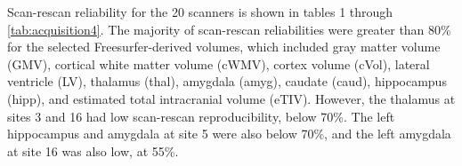 Scan-rescan reliability for the 20 scanners is shown in tables 1 through \ref{tab:acquisition4}. The majority of scan-rescan reliabilities were greater than 80\% for the selected Freesurfer-derived volumes, which included gray matter volume (GMV), cortical white matter volume (cWMV), cortex volume (cVol), lateral ventricle (LV), thalamus (thal), amygdala (amyg), caudate (caud), hippocampus (hipp), and estimated total intracranial volume (eTIV). However, the thalamus at sites 3 and 16 had low scan-rescan reproducibility, below 70\%. The left hippocampus and amygdala at site 5 were also below 70\%, and the left amygdala at site 16 was also low, at 55\%. %